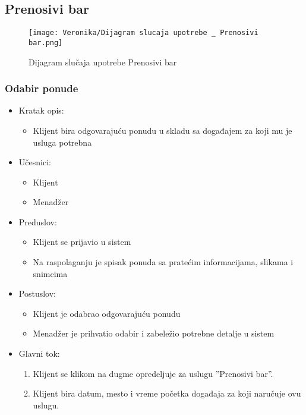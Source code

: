 \documentclass[a4paper]{article}
\begin{document}
\subsection{Prenosivi bar}

\begin{figure}[H]
    \centering
    \texttt{[image: Veronika/Dijagram slucaja upotrebe \_ Prenosivi bar.png]}
    \caption{Dijagram slučaja upotrebe Prenosivi bar}
    \label{fig:PrenosiviBar}
\end{figure}

\subsubsection{Odabir ponude}

\begin{itemize}
    \item Kratak opis:
        \begin{itemize}
            \item Klijent bira odgovarajuću ponudu u skladu sa događajem za koji mu je usluga potrebna
        \end{itemize}
    \item Učesnici:
        \begin{itemize}
            \item Klijent
            \item Menadžer 
        \end{itemize}
    \item Preduslov:
        \begin{itemize}
            \item Klijent se prijavio u sistem
		    \item Na raspolaganju je spisak ponuda sa pratećim informacijama, slikama i snimcima
        \end{itemize}
    \item Postuslov:
        \begin{itemize}
            \item Klijent je odabrao odgovarajuću ponudu
            \item Menadžer je prihvatio odabir i zabeležio potrebne detalje u sistem
        \end{itemize}
    \item Glavni tok:
        \begin{enumerate}
          \item  Klijent se klikom na dugme opredeljuje za uslugu ''Prenosivi bar''.
        \item Klijent bira datum, mesto i vreme početka događaja za koji naručuje ovu uslugu.

\end{enumerate}
\end{itemize}
\end{document}
